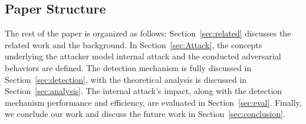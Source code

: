 \subsection*{Paper Structure}
The rest of the paper is organized as follows: Section~\ref{sec:related} discusses the related work and the background.
In Section~\ref{sec:Attack}, the concepts underlying the attacker model internal attack and the conducted adversarial behaviors are defined.
The detection mechanism is fully discussed in Section~\ref{sec:detection}, with the theoretical analysis is discussed in Section~\ref{sec:analysis}.
The internal attack's impact, along with the detection mechanism performance and efficiency, are evaluated in Section~\ref{sec:eval}. Finally, we conclude our work and discuss the future work in Section~\ref{sec:conclusion}.





 


